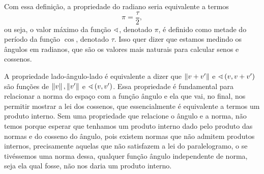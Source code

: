 Com essa definição, a propriedade do radiano seria equivalente a termos
	\begin{equation*}
	\pi = \frac{\tau}{2},
	\end{equation*}
ou seja, o valor máximo da função $\sphericalangle$, denotado $\pi$, é definido como metade do período da função $\cos$, denotado $\tau$. Isso quer dizer que estamos medindo os ângulos em radianos, que são os valores mais naturais para calcular senos e cossenos.

A propriedade lado-ângulo-lado é equivalente a dizer que $\left\Vert{v+v'}\right\Vert$ e $\sphericalangle\left({v},{v+v'}\right)$ são funções de $\left\Vert{v}\right\Vert, \left\Vert{v'}\right\Vert$ e $\sphericalangle\left({v},{v'}\right)$. Essa propriedade é fundamental para relacionar a norma do espaço com a função ângulo e ela que vai, no final, nos permitir mostrar a lei dos cossenos, que essencialmente é equivalente a termos um produto interno. Sem uma propriedade que relacione o ângulo e a norma, não temos porque esperar que tenhamos um produto interno dado pelo produto das normas e do cosseno do ângulo, pois existem normas que não admitem produtos internos, precisamente aquelas que não satisfazem a lei do paralelogramo, o se tivéssemos uma norma dessa, qualquer função ângulo independente de norma, seja ela qual fosse, não nos daria um produto interno.

